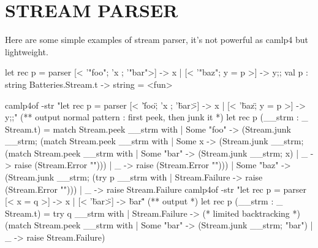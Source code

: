 \section{STREAM PARSER}

Here are some simple examples of stream parser, it's not powerful as
camlp4 but lightweight.

\begin{ocamlcode}
let rec p = parser [< '"foo"; 'x ; '"bar">] -> x | [< '"baz"; y = p >] -> y;;
val p : string Batteries.Stream.t -> string = <fun>
\end{ocamlcode}

\begin{ocamlcode}
camlp4of  -str "let rec p = parser [< '\"foo\"; 'x ; '\"bar\">] -> x | [< '\"baz\"; y = p >] -> y;;"
(** output 
   normal pattern : first peek, then junk it 
*)
let rec p (__strm : _ Stream.t) =
  match Stream.peek __strm with
  | Some "foo" ->
      (Stream.junk __strm;
       (match Stream.peek __strm with
        | Some x ->
            (Stream.junk __strm;
             (match Stream.peek __strm with
              | Some "bar" -> (Stream.junk __strm; x)
              | _ -> raise (Stream.Error "")))
        | _ -> raise (Stream.Error "")))
  | Some "baz" ->
      (Stream.junk __strm;
       (try p __strm with | Stream.Failure -> raise (Stream.Error "")))
  | _ -> raise Stream.Failure
camlp4of -str "let rec p = parser [< x = q >] -> x | [< '\"bar\">] -> \"bar\""
(** output  *)
let rec p (__strm : _ Stream.t) =
  try q __strm
  with
  | Stream.Failure -> (* limited backtracking *)
      (match Stream.peek __strm with
       | Some "bar" -> (Stream.junk __strm; "bar")
       | _ -> raise Stream.Failure)
\end{ocamlcode}


